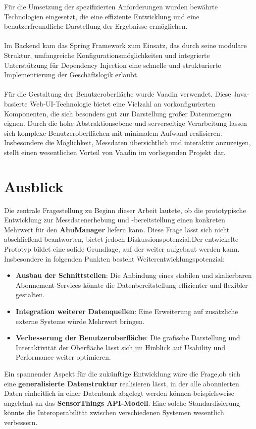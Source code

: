 \documentclass[a4paper,12pt]{scrreprt}
\begin{document}
Für die Umsetzung der spezifizierten Anforderungen wurden bewährte Technologien eingesetzt, die eine effiziente Entwicklung und eine benutzerfreundliche Darstellung der Ergebnisse ermöglichen.\\ \\
Im Backend kam das Spring Framework zum Einsatz, das durch seine modulare Struktur, umfangreiche Konfigurationsmöglichkeiten und integrierte Unterstützung für Dependency Injection eine schnelle und strukturierte Implementierung der Geschäftslogik erlaubt.\\ \\
Für die Gestaltung der Benutzeroberfläche wurde Vaadin verwendet. Diese Java-basierte Web-UI-Technologie bietet eine Vielzahl an vorkonfigurierten Komponenten, die sich besonders gut zur Darstellung großer Datenmengen eignen. Durch die hohe Abstraktionsebene und serverseitige Verarbeitung lassen sich komplexe Benutzeroberflächen mit minimalem Aufwand realisieren. Insbesondere die Möglichkeit, Messdaten übersichtlich und interaktiv anzuzeigen, stellt einen wesentlichen Vorteil von Vaadin im vorliegenden Projekt dar.
\section{Ausblick}
Die zentrale Fragestellung zu Beginn dieser Arbeit lautete, ob die prototypische Entwicklung zur Messdatenerhebung und -bereitstellung einen konkreten Mehrwert für den \textbf{AhuManager} liefern kann. Diese Frage lässt sich nicht abschließend beantworten, bietet jedoch Diskussionspotenzial.Der entwickelte Prototyp bildet eine solide Grundlage, auf der weiter aufgebaut werden kann.\\
Insbesondere in folgenden Punkten besteht Weiterentwicklungspotenzial:
\begin{itemize}
	\item \textbf{Ausbau der Schnittstellen}: Die Anbindung eines stabilen und skalierbaren Abonnement-Services könnte die Datenbereitstellung effizienter und flexibler gestalten.
	\item \textbf{Integration weiterer Datenquellen}: Eine Erweiterung auf zusätzliche externe Systeme würde Mehrwert bringen.
	\item \textbf{Verbesserung der Benutzeroberfläche}: Die grafische Darstellung und Interaktivität der Oberfläche lässt sich im Hinblick auf Usability und Performance weiter optimieren.
\end{itemize}
Ein spannender Aspekt für die zukünftige Entwicklung wäre die Frage,ob sich eine \textbf{generalisierte Datenstruktur} realisieren lässt, in der alle abonnierten Daten einheitlich in einer Datenbank abgelegt werden können-beispielsweise angelehnt an das \textbf{SensorThings API-Modell}. Eine solche Standardisierung könnte die Interoperabilität zwischen verschiedenen Systemen wesentlich verbessern.	
\printbibliography
\end{document}
